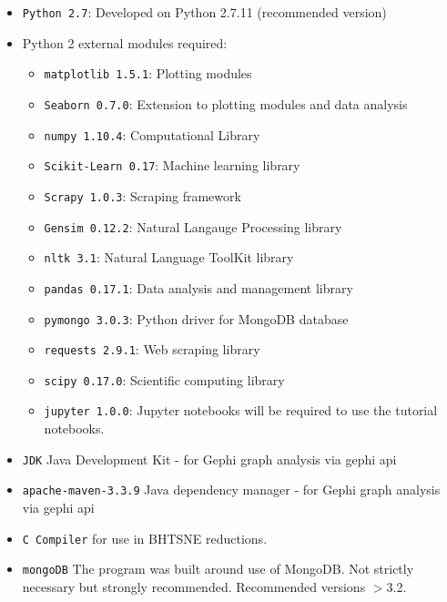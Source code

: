 \begin{itemize}
\itemsep-.6em
\item \texttt{Python 2.7}: Developed on Python 2.7.11 (recommended version)
\item Python 2 external modules required:
	\begin{itemize}
	\itemsep-.6em
	\item \texttt{matplotlib 1.5.1}: Plotting modules \cite{matplotlib}
	\item \texttt{Seaborn 0.7.0}: Extension to plotting modules and data analysis \cite{seaborn}
    \item \texttt{numpy 1.10.4}: Computational Library	 \cite{numpy}
	\item \texttt{Scikit-Learn 0.17}: Machine learning library \cite{scikitlearn}
	\item \texttt{Scrapy 1.0.3}: Scraping framework
	\item \texttt{Gensim 0.12.2}: Natural Langauge Processing library \cite{gensim}
	\item \texttt{nltk 3.1}: Natural Language ToolKit library \cite{nltk}
	\item \texttt{pandas 0.17.1}: Data analysis and management library \cite{pandas}
	\item \texttt{pymongo 3.0.3}: Python driver for MongoDB database 
    \item \texttt{requests 2.9.1}: Web scraping library 
    \item \texttt{scipy 0.17.0}: Scientific computing library \cite{scipy}
	\item \texttt{jupyter 1.0.0}: Jupyter notebooks will be required to use the tutorial notebooks\cite{jupyter}.
    \end{itemize}
\item \texttt{JDK} Java Development Kit - for Gephi graph analysis via gephi api
\item \texttt{apache-maven-3.3.9} Java dependency manager - for Gephi graph analysis via gephi api
\item \texttt{C Compiler} for use in BHTSNE reductions\cite{bhtsne}.
\item \texttt{mongoDB} The program was built around use of MongoDB. Not strictly necessary but strongly recommended. Recommended versions $>$3.2.
\end{itemize}  

